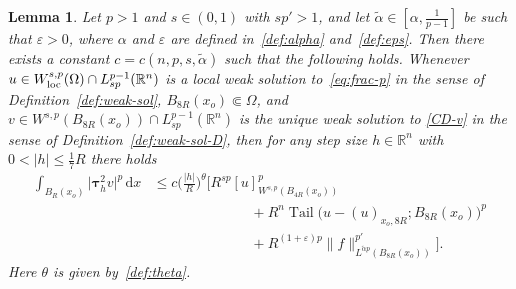 \documentclass[10pt,letterpaper]{amsart}
\newtheorem{lemma}[theorem]{Lemma}
\theoremstyle{definition}
\numberwithin{theorem}{section}
\numberwithin{equation}{section}
\newcommand{\1}{\ensuremath{\mathds{1}}}
\newcommand{\dx}{\mathrm{d}x}
\renewcommand{\epsilon}{\varepsilon}
\renewcommand{\epsilon}{\varepsilon}
\DeclareMathOperator{\Tail}{Tail}
\numberwithin{equation}{section}
\begin{document}
\begin{lemma}\label{lem:vi-1}
Let $p>1$ and $s\in(0,1)$ with $sp'>1$, and let $\tilde\alpha\in[\alpha,\frac{1}{p-1}]$ be such that $\epsilon>0$, where $\alpha$ and $\epsilon$ are defined in~\eqref{def:alpha} and~\eqref{def:eps}. 
Then there exists a constant $c=c(n,p,s,\tilde\alpha)$ such that the following holds.
Whenever 
\(u \in W^{s,p}_{\rm loc}(\Omega)\cap L^{p-1}_{sp}(\mathbb{R}^n)\)
is a local weak solution to~\eqref{eq:frac-p} in the sense of Definition~\ref{def:weak-sol},
$B_{8R}(x_o)\Subset\Omega$, and 
\(v \in W^{s,p}(B_{8R}(x_o))\cap L^{p-1}_{sp}(\mathbb{R}^n)\)
is the unique weak solution to \eqref{CD-v} in the sense of Definition~\ref{def:weak-sol-D},
then for any step size \(h\in\mathbb{R}^n\) with \(0<|h|\le \tfrac17 R\) there holds
\begin{align*}
    \int_{B_R(x_o)} \big|\boldsymbol{\tau}_h^2 v\big|^p \,\dx  
    &\leq 
    c \Big(\frac{|h|}{R}\Big)^{\theta} 
    \Bigg[ R^{s p} [u]_{W^{s,p}(B_{4R}(x_o))}^p  \\
    &\qquad\qquad\qquad\quad + 
    R^n \Tail \big(u - (u)_{x_o,8R}; B_{8R}(x_o)\big)^p \\
    &\qquad\qquad\qquad\quad + 
    R^{(1+\epsilon)p} \|f\|_{L^{\tilde\alpha p}(B_{8R}(x_o))}^{p'}\Bigg] .
\end{align*}
Here $\theta$ is given by~\eqref{def:theta}.
\end{lemma}
\end{document}
